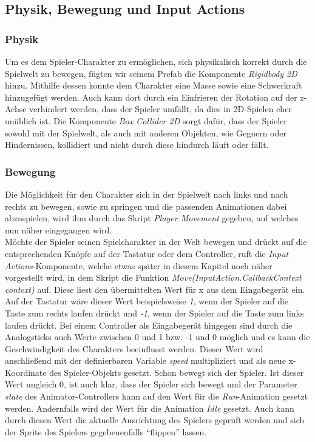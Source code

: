 \subsection{Physik, Bewegung und Input Actions}
\label{section: physik_bewegung}

\subsubsection*{Physik}
Um es dem Spieler-Charakter zu ermöglichen, sich physikalisch korrekt durch die Spielwelt zu bewegen, fügten wir seinem Prefab die Komponente \textit{Rigidbody 2D} hinzu. Mithilfe dessen konnte dem Charakter eine Masse sowie eine Schwerkraft hinzugefügt werden. Auch kann dort durch ein Einfrieren der Rotation auf der z-Achse verhindert werden, dass der Spieler umfällt, da dies in 2D-Spielen eher unüblich ist. Die Komponente \textit{Box Collider 2D} sorgt dafür, dass der Spieler sowohl mit der Spielwelt, als auch mit anderen Objekten, wie Gegnern oder Hindernissen, kollidiert und nicht durch diese hindurch läuft oder fällt.\\

\subsubsection*{Bewegung}
Die Möglichkeit für den Charakter sich in der Spielwelt nach links und nach rechts zu bewegen, sowie zu springen und die passenden Animationen dabei abzuspielen, wird ihm durch das Skript \textit{Player Movement} gegeben, auf welches nun näher eingegangen wird.\\

Möchte der Spieler seinen Spielcharakter in der Welt bewegen und drückt auf die entsprechenden Knöpfe auf der Tastatur oder dem Controller, ruft die \textit{Input Actions}-Komponente, welche etwas später in diesem Kapitel noch näher vorgestellt wird, in dem Skript die Funktion \textit{Move(InputAction.CallbackContext context)} auf. Diese liest den übermittelten Wert für x aus dem Eingabegerät ein. Auf der Tastatur wäre dieser Wert beispielsweise \textit{1}, wenn der Spieler auf die Taste zum rechts laufen drückt und \textit{-1}, wenn der Spieler auf die Taste zum links laufen drückt. Bei einem Controller als Eingabegerät hingegen sind durch die Analogsticks auch Werte zwischen 0 und 1 bzw. -1 und 0 möglich und es kann die Geschwindigkeit des Charakters beeinflusst werden. Dieser Wert wird anschließend mit der definierbaren Variable \textit{speed} multipliziert und als neue x-Koordinate des Spieler-Objekts gesetzt. Schon bewegt sich der Spieler. Ist dieser Wert ungleich 0, ist auch klar, dass der Spieler sich bewegt und der Parameter \textit{state} des Animator-Controllers kann auf den Wert für die \textit{Run}-Animation gesetzt werden. Andernfalls wird der Wert für die Animation \textit{Idle} gesetzt. Auch kann durch diesen Wert die aktuelle Ausrichtung des Spielers geprüft werden und sich der Sprite des Spielers gegebenenfalls \enquote{flippen} lassen.\\

